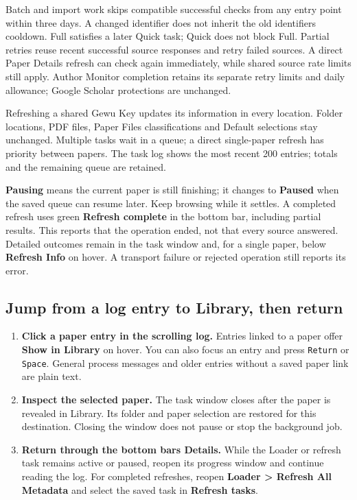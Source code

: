 \documentclass[10pt,letterpaper,oneside]{scrreprt}
\providecommand{\tightlist}{\setlength{\itemsep}{1pt}\setlength{\parskip}{0pt}}
\begin{document}
Batch and import work skips compatible successful checks from any entry point within three days. A changed identifier does not inherit the old identifier\textquotesingle s cooldown. Full satisfies a later Quick task; Quick does not block Full. Partial retries reuse recent successful source responses and retry failed sources. A direct Paper Details refresh can check again immediately, while shared source rate limits still apply. Author Monitor completion retains its separate retry limits and daily allowance; Google Scholar protections are unchanged.

Refreshing a shared Gewu Key updates its information in every location. Folder locations, PDF files, Paper Files classifications and Default selections stay unchanged. Multiple tasks wait in a queue; a direct single-paper refresh has priority between papers. The task log shows the most recent 200 entries; totals and the remaining queue are retained.

\textbf{Pausing} means the current paper is still finishing; it changes to \textbf{Paused} when the saved queue can resume later. Keep browsing while it settles. A completed refresh uses green \textbf{Refresh complete} in the bottom bar, including partial results. This reports that the operation ended, not that every source answered. Detailed outcomes remain in the task window and, for a single paper, below \textbf{Refresh Info} on hover. A transport failure or rejected operation still reports its error.

\subsection{Jump from a log entry to Library, then return}\label{jump-from-a-log-entry-to-library-then-return}

\begin{enumerate}
\tightlist
\item
  \textbf{Click a paper entry in the scrolling log.} Entries linked to a paper offer \textbf{Show in Library} on hover. You can also focus an entry and press \texttt{Return} or \texttt{Space}. General process messages and older entries without a saved paper link are plain text.
\item
  \textbf{Inspect the selected paper.} The task window closes after the paper is revealed in Library. Its folder and paper selection are restored for this destination. Closing the window does not pause or stop the background job.
\item
  \textbf{Return through the bottom bar\textquotesingle s \textbf{Details}.} While the Loader or refresh task remains active or paused, reopen its progress window and continue reading the log. For completed refreshes, reopen \textbf{Loader \textgreater{} Refresh All Metadata} and select the saved task in \textbf{Refresh tasks}.
\end{enumerate}
\end{document}
